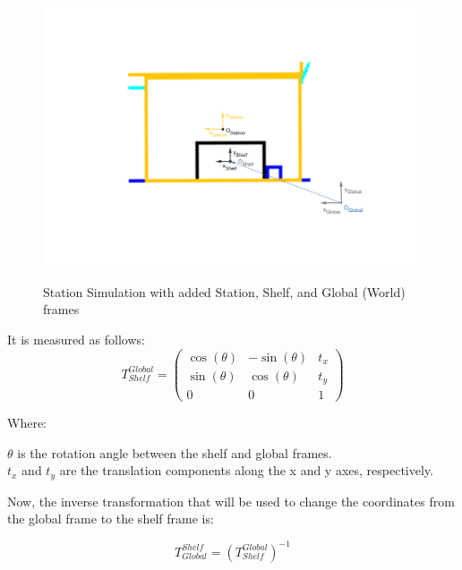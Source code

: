 \begin{figure}[H]
    \begin{center}
        \includegraphics[width=5in]{images/Chap2/Fixed_frames.png}\\
        \caption{Station Simulation with added Station, Shelf, and Global (World) frames}
        \label{Station}
        \end{center}    
\end{figure}

It is measured as follows:
\begin{equation}
    T_{Shelf}^{Global} = 
    \begin{pmatrix}
    \cos(\theta) & -\sin(\theta) & t_x \\
    \sin(\theta) & \cos(\theta) & t_y \\
    0 & 0 & 1
    \label{shToGlob}
    \end{pmatrix}
    \end{equation}
    
    \noindent Where:
    
    \noindent $\theta$ is the rotation angle between the shelf and global frames. \\

    \noindent $t_x$ and $t_y$ are the translation components along the x and y axes, respectively.
    
    \vspace{1em} 
Now, the inverse transformation that will be used to change the coordinates from 
the global frame to the shelf frame is:
    
    \begin{equation}
    T_{Global}^{Shelf} = \left( T_{Shelf}^{Global} \right)^{-1}
    \end{equation}

